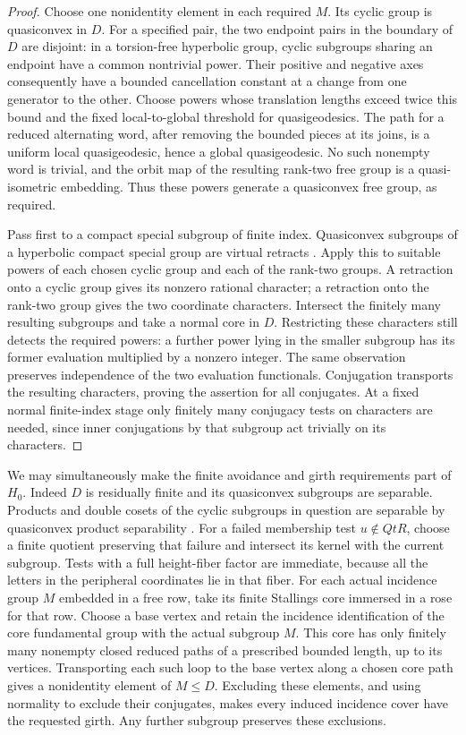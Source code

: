 \begin{proof}
Choose one nonidentity element in each required \(M\).  Its cyclic
group is quasiconvex in \(D\).  For a specified pair, the two endpoint
pairs in the boundary of \(D\) are disjoint: in a torsion-free
hyperbolic group, cyclic subgroups sharing an endpoint have a common
nontrivial power.  Their positive and negative axes consequently have
a bounded cancellation constant at a change from one generator to
the other.  Choose powers whose translation lengths exceed twice
this bound and the fixed local-to-global threshold for quasigeodesics.
The path for a reduced alternating word, after removing the bounded
pieces at its joins, is a uniform local quasigeodesic, hence a global
quasigeodesic.  No such nonempty word is trivial, and the orbit map
of the resulting rank-two free group is a quasi-isometric embedding.
Thus these powers generate a quasiconvex free group, as required.

Pass first to a compact special subgroup of finite index.
Quasiconvex subgroups of a hyperbolic compact special group are virtual
retracts \cite{HaglundWise2008,HaglundWise2012}.  Apply this to suitable
powers of each chosen cyclic group and each of the rank-two groups.
A retraction onto a cyclic group gives its nonzero rational character;
a retraction onto the rank-two group gives the two coordinate
characters.  Intersect the finitely many resulting subgroups and take
a normal core in \(D\).  Restricting these characters still detects
the required powers: a further power lying in the smaller subgroup
has its former evaluation multiplied by a nonzero integer.  The same
observation preserves independence of the two evaluation functionals.
Conjugation transports the resulting characters, proving the assertion
for all conjugates.  At a fixed normal finite-index stage only finitely
many conjugacy tests on characters are needed, since inner
conjugations by that subgroup act trivially on its characters.
\end{proof}

We may simultaneously make the finite avoidance and girth requirements
part of \(H_0\).  Indeed \(D\) is residually finite and its quasiconvex
subgroups are separable.  Products and double cosets of the cyclic
subgroups in question are separable by quasiconvex product separability
\cite{Minasyan2006}.  For a failed membership test \(u\notin Q tR\),
choose a finite quotient preserving that failure and intersect its
kernel with the current subgroup.  Tests with a full height-fiber
factor are immediate, because all the letters in the peripheral
coordinates lie in that fiber.  For each actual incidence group \(M\)
embedded in a free row, take its finite Stallings core immersed in a
rose for that row.  Choose a base vertex and retain the incidence
identification of the core fundamental group with the actual subgroup
\(M\).  This core has only finitely many nonempty closed reduced
paths of a prescribed bounded length, up to its vertices.  Transporting
each such loop to the base vertex along a chosen core path gives a
nonidentity element of \(M\le D\).  Excluding these elements, and
using normality to exclude their conjugates, makes every induced
incidence cover have the requested girth.  Any further subgroup
preserves these exclusions.

